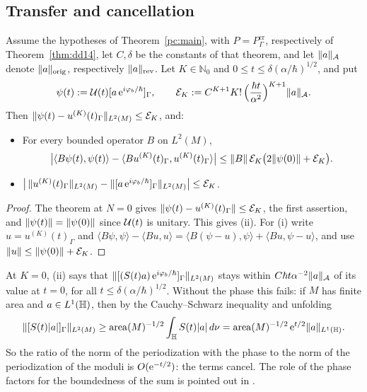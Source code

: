\subsection{Transfer and cancellation}\label{subsec:ev-transfer}
\begin{corollary}\label{ev:transfer}
Assume the hypotheses of Theorem~\ref{pc:main}, with $P=P^{\mathrm{cr}}_\Gamma$, respectively of Theorem~\ref{thm:dd14}, let $C,\delta$ be
the constants of that theorem, and let $\lVert a\rVert_{\mathcal A}$ denote $\lVert a\rVert_{\mathrm{orig}}$, respectively $\lVert a\rVert_{\mathrm{rev}}$. Let $K\in\mathbb N_0$ and $0\le t\le\delta(\alpha/\hbar)^{1/2}$, and put
\[
  \psi(t):=\mathcal{U}(t)[a\,\mathrm{e}^{i\varphi_b/\hbar}]_\Gamma,\qquad
  \mathcal E_K:=C^{K+1}K!\,\Big(\frac{\hbar t}{\alpha^2}\Big)^{K+1}\lVert a\rVert_{\mathcal A} .
\]
Then $\lVert \psi(t)-u^{(K)}(t)_\Gamma\rVert_{L^2(M)}\le\mathcal E_K$, and:
\begin{itemize}
\item[(i)] For every bounded operator $B$ on $L^2(M)$,
\[
  \big|\langle B\psi(t),\psi(t)\rangle-\langle Bu^{(K)}(t)_\Gamma,u^{(K)}(t)_\Gamma\rangle\big|
  \le\lVert B\rVert\,\mathcal E_K\big(2\lVert \psi(0)\rVert+\mathcal E_K\big).
\]
\item[(ii)] $\big|\,\lVert u^{(K)}(t)_\Gamma\rVert_{L^2(M)}-\lVert [a\,\mathrm{e}^{i\varphi_b/\hbar}]_\Gamma\rVert_{L^2(M)}\big|\le\mathcal E_K$.
\end{itemize}
\end{corollary}
\begin{proof}
The theorem at $N=0$ gives $\lVert \psi(t)-u^{(K)}(t)_\Gamma\rVert\le\mathcal E_K$, the first assertion, and $\lVert \psi(t)\rVert=\lVert \psi(0)\rVert$
since $\mathcal{U}(t)$ is unitary. This gives (ii). For (i) write $u=u^{(K)}(t)_\Gamma$ and
$\langle B\psi,\psi\rangle-\langle Bu,u\rangle=\langle B(\psi-u),\psi\rangle+\langle Bu,\psi-u\rangle$, and use
$\lVert u\rVert\le\lVert \psi(0)\rVert+\mathcal E_K$.
\end{proof}

\begin{remark}[cancellation]\label{ev:cancel}
At $K=0$, (ii) says that $\lVert [(S(t)a)\,\mathrm{e}^{i\varphi_b/\hbar}]_\Gamma\rVert_{L^2(M)}$ stays within $C\hbar t\alpha^{-2}\lVert a\rVert_{\mathcal A}$ of its value at $t=0$,
for all $t\le\delta(\alpha/\hbar)^{1/2}$. Without the phase this fails: if $M$ has finite area and $a\in L^1(\mathbb{H})$, then by the
Cauchy--Schwarz inequality and unfolding
\[
  \lVert [S(t)|a|]_\Gamma\rVert_{L^2(M)}\ge\operatorname{area}(M)^{-1/2}\int_{\mathbb{H}} S(t)|a|\,d\nu=\operatorname{area}(M)^{-1/2}\,\mathrm{e}^{t/2}\lVert a\rVert_{L^1(\mathbb{H})} .
\]
So the ratio of the norm of the periodization with the phase to the norm of the periodization of the moduli is $O(\mathrm{e}^{-t/2})$:
the terms cancel. The role of the phase factors for the boundedness of the sum is pointed out in
\cite[Remark~1.9]{S}.
\end{remark}

